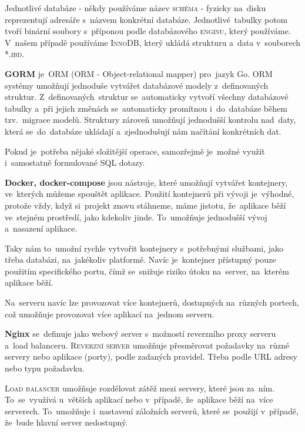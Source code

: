 \documentclass[14pt,a4paper]{article}
\begin{document}
            Jednotlivé databáze - někdy používáme název \textsc{schéma} - fyzicky na~disku reprezentují adresáře s~názvem konkrétní databáze. Jednotlivé~tabulky potom tvoří binární soubory s~příponou podle databázového \textsc{enginu}, který používáme. V~našem případě používáme \textsc{InnoDB}, který ukládá strukturu a~data v~souborech \textsc{*.ibd}. \parencite{MySQLInnoDB}
            
            \textbf{GORM} je~ORM (ORM - Object-relational mapper) pro~jazyk Go. \textsc{ORM} systémy umožňují jednoduše vytvářet databázové modely z~definovaných struktur. 
            Z~definovaných~struktur se~automaticky vytvoří všechny databázové tabulky a~při jejich změnách se~automaticky promítnou i~do~databáze během tzv.~migrace modelů.
            Struktury zároveň umožňují jednodušší kontrolu nad~daty, která se~do~databáze ukládají a~zjednodušují nám načítání konkrétních dat. \parencite{freecodecamp:orm}

            Pokud je~potřeba nějaké složitější operace, samozřejmě je~možné využít i~samostatně formulované SQL dotazy. \parencite{gormGORM}

            \textbf{Docker, docker-compose} jsou nástroje, které umožňují vytvářet kontejnery, ve~kterých můžeme spouštět aplikace.
            Použití kontejnerů při vývoji je~výhodné, protože vždy, když si~projekt znovu stáhneme, máme jistotu, že~aplikace běží
            ve~stejném prostředí, jako kdekoliv jinde. To~umožňuje jednodušší vývoj a~nasazení aplikace.

            Taky nám to~umožní rychle vytvořit kontejnery s~potřebnými službami, jako třeba databázi, na~jakékoliv platformě. Navíc je~kontejner přístupný pouze použitím specifického portu,
            čímž se~snižuje riziko útoku na~server, na~kterém aplikace běží. \parencite{docker}

            Na~serveru navíc lze provozovat více kontejnerů, dostupných na~různých portech, což umožňuje provozovat více aplikací na~jednom serveru.

            \textbf{Nginx} se~definuje jako webový server s~možností reverzního proxy serveru a~load balanceru.
            \textsc{Reverzní server} umožňuje přesměrovat požadavky na~různé servery nebo aplikace (porty), podle zadaných pravidel.
            Třeba podle URL adresy nebo typu požadavku.
            
            \textsc{Load balancer} umožňuje rozdělovat zátěž mezi servery, které jsou za~ním. To~se~využívá u~větších aplikací nebo v~případě, že~aplikace běží na~více serverech.
            To~umožňuje i~nastavení záložních serverů, které se~použijí v~případě, že~bude hlavní server nedostupný.
            
\end{document}
